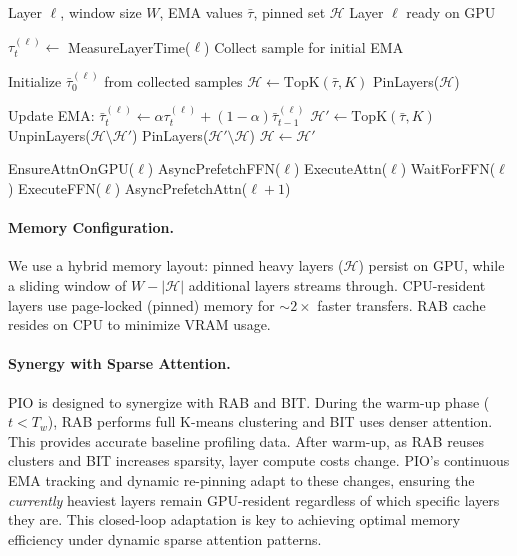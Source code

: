 \begin{algorithm}[t]
\caption{PIO: Profile-Informed Offloading}
\label{alg:offload}
\begin{algorithmic}[1]
\REQUIRE Layer $\ell$, window size $W$, EMA values $\bar{\tau}$, pinned set $\mathcal{H}$
\ENSURE Layer $\ell$ ready on GPU

\STATE {}
    \STATE $\tau^{(\ell)}_t \gets$ MeasureLayerTime($\ell$)
    \STATE Collect sample for initial EMA
\ENDIF

\STATE {}
    \STATE Initialize $\bar{\tau}^{(\ell)}_0$ from collected samples
    \STATE $\mathcal{H} \gets \text{TopK}(\bar{\tau}, K)$ 
    \STATE PinLayers($\mathcal{H}$)
\ENDIF

\STATE {}
    \STATE Update EMA: $\bar{\tau}^{(\ell)}_t \gets \alpha \tau^{(\ell)}_t + (1-\alpha)\bar{\tau}^{(\ell)}_{t-1}$
    \STATE $\mathcal{H}' \gets \text{TopK}(\bar{\tau}, K)$
        \STATE UnpinLayers($\mathcal{H} \setminus \mathcal{H}'$)
        \STATE PinLayers($\mathcal{H}' \setminus \mathcal{H}$)
        \STATE $\mathcal{H} \gets \mathcal{H}'$
    \ENDIF
\ENDIF

\STATE {}
    \STATE {}
\ELSE
    \STATE EnsureAttnOnGPU($\ell$)
    \STATE AsyncPrefetchFFN($\ell$) 
\ENDIF
\STATE ExecuteAttn($\ell$)
\STATE WaitForFFN($\ell$)
\STATE ExecuteFFN($\ell$)
\STATE AsyncPrefetchAttn($\ell + 1$) 
\end{algorithmic}
\end{algorithm}

\paragraph{Memory Configuration.}
We use a hybrid memory layout: pinned heavy layers ($\mathcal{H}$) persist on GPU, while a sliding window of $W{-}|\mathcal{H}|$ additional layers streams through. CPU-resident layers use page-locked (pinned) memory for ${\sim}2\times$ faster transfers. RAB cache resides on CPU to minimize VRAM usage.

\paragraph{Synergy with Sparse Attention.}
PIO is designed to synergize with RAB and BIT. During the warm-up phase ($t < T_w$), RAB performs full K-means clustering and BIT uses denser attention. This provides accurate baseline profiling data. After warm-up, as RAB reuses clusters and BIT increases sparsity, layer compute costs change. PIO's continuous EMA tracking and dynamic re-pinning adapt to these changes, ensuring the \emph{currently} heaviest layers remain GPU-resident regardless of which specific layers they are. This closed-loop adaptation is key to achieving optimal memory efficiency under dynamic sparse attention patterns.

